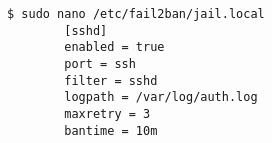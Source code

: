 
\begin{lstlisting}[language=term,caption=Konfiguration des ssh jails von fail2ban,label={lst:fail2ban-ssh}]
    $ sudo nano /etc/fail2ban/jail.local
        [sshd]
        enabled = true
        port = ssh
        filter = sshd
        logpath = /var/log/auth.log
        maxretry = 3
        bantime = 10m
\end{lstlisting}